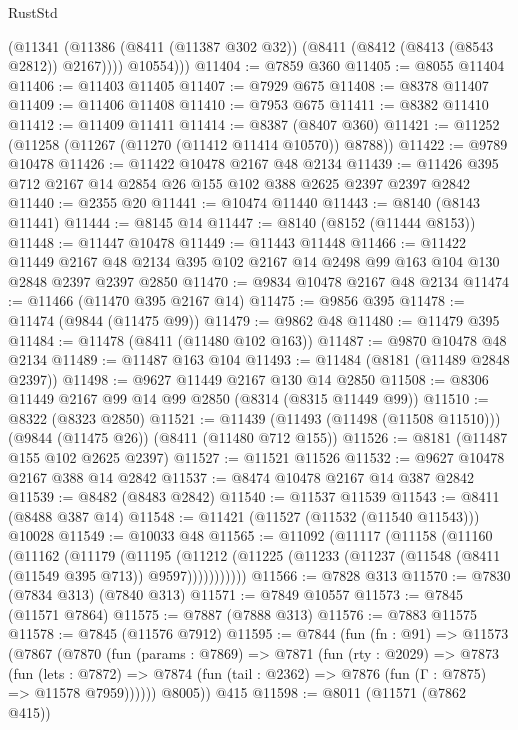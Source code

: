 \begin{lexlean}{RustStd}
\begin{coremodule}
          (@11341 (@11386 (@8411 (@11387 @302 @32)) (@8411 (@8412 (@8413 (@8543 @2812)) @2167))))
          @10554)))
@11404 := @7859 @360
@11405 := @8055 @11404
@11406 := @11403 @11405
@11407 := @7929 @675
@11408 := @8378 @11407
@11409 := @11406 @11408
@11410 := @7953 @675
@11411 := @8382 @11410
@11412 := @11409 @11411
@11414 := @8387 (@8407 @360)
@11421 := @11252 (@11258 (@11267 (@11270 (@11412 @11414 @10570)) @8788))
@11422 := @9789 @10478
@11426 := @11422 @10478 @2167 @48 @2134
@11439 := @11426 @395 @712 @2167 @14 @2854 @26 @155 @102 @388 @2625 @2397 @2397 @2842
@11440 := @2355 @20
@11441 := @10474 @11440
@11443 := @8140 (@8143 @11441)
@11444 := @8145 @14
@11447 := @8140 (@8152 (@11444 @8153))
@11448 := @11447 @10478
@11449 := @11443 @11448
@11466 := @11422
    @11449
    @2167
    @48
    @2134
    @395
    @102
    @2167
    @14
    @2498
    @99
    @163
    @104
    @130
    @2848
    @2397
    @2397
    @2850
@11470 := @9834 @10478 @2167 @48 @2134
@11474 := @11466 (@11470 @395 @2167 @14)
@11475 := @9856 @395
@11478 := @11474 (@9844 (@11475 @99))
@11479 := @9862 @48
@11480 := @11479 @395
@11484 := @11478 (@8411 (@11480 @102 @163))
@11487 := @9870 @10478 @48 @2134
@11489 := @11487 @163 @104
@11493 := @11484 (@8181 (@11489 @2848 @2397))
@11498 := @9627 @11449 @2167 @130 @14 @2850
@11508 := @8306 @11449 @2167 @99 @14 @99 @2850 (@8314 (@8315 @11449 @99))
@11510 := @8322 (@8323 @2850)
@11521 := @11439 (@11493 (@11498 (@11508 @11510))) (@9844 (@11475 @26)) (@8411 (@11480 @712 @155))
@11526 := @8181 (@11487 @155 @102 @2625 @2397)
@11527 := @11521 @11526
@11532 := @9627 @10478 @2167 @388 @14 @2842
@11537 := @8474 @10478 @2167 @14 @387 @2842
@11539 := @8482 (@8483 @2842)
@11540 := @11537 @11539
@11543 := @8411 (@8488 @387 @14)
@11548 := @11421 (@11527 (@11532 (@11540 @11543))) @10028
@11549 := @10033 @48
@11565 := @11092
    (@11117
      (@11158
        (@11160
          (@11162
            (@11179
              (@11195
                (@11212 (@11225 (@11233 (@11237 (@11548 (@8411 (@11549 @395 @713)) @9597)))))))))))
@11566 := @7828 @313
@11570 := @7830 (@7834 @313) (@7840 @313)
@11571 := @7849 @10557
@11573 := @7845 (@11571 @7864)
@11575 := @7887 (@7888 @313)
@11576 := @7883 @11575
@11578 := @7845 (@11576 @7912)
@11595 := @7844
    (fun (fn : @91) =>
    @11573
      (@7867
        (@7870
          (fun (params : @7869) =>
          @7871
            (fun (rty : @2029) =>
            @7873
              (fun (lets : @7872) =>
              @7874 (fun (tail : @2362) => @7876 (fun (Γ : @7875) => @11578 @7959))))))
        @8005))
    @415
@11598 := @8011 (@11571 (@7862 @415))

\end{coremodule}
\end{lexlean}
